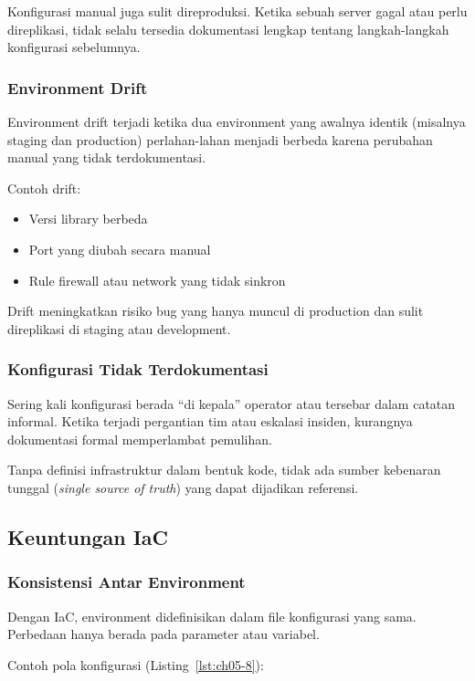 Konfigurasi manual juga sulit direproduksi. Ketika sebuah server gagal atau perlu direplikasi, tidak selalu tersedia dokumentasi lengkap tentang langkah-langkah konfigurasi sebelumnya.

\subsubsection*{Environment Drift}

Environment drift terjadi ketika dua environment yang awalnya identik (misalnya staging dan production) perlahan-lahan menjadi berbeda karena perubahan manual yang tidak terdokumentasi.

Contoh drift:
\begin{itemize}
\item Versi library berbeda
\item Port yang diubah secara manual
\item Rule firewall atau network yang tidak sinkron
\end{itemize}

Drift meningkatkan risiko bug yang hanya muncul di production dan sulit direplikasi di staging atau development.

\subsubsection*{Konfigurasi Tidak Terdokumentasi}

Sering kali konfigurasi berada ``di kepala'' operator atau tersebar dalam catatan informal. Ketika terjadi pergantian tim atau eskalasi insiden, kurangnya dokumentasi formal memperlambat pemulihan.

Tanpa definisi infrastruktur dalam bentuk kode, tidak ada sumber kebenaran tunggal (\textit{single source of truth}) yang dapat dijadikan referensi.

\subsection{Keuntungan IaC}

\subsubsection*{Konsistensi Antar Environment}

Dengan IaC, environment didefinisikan dalam file konfigurasi yang sama. Perbedaan hanya berada pada parameter atau variabel.

Contoh pola konfigurasi (Listing~\ref{lst:ch05-8}):

